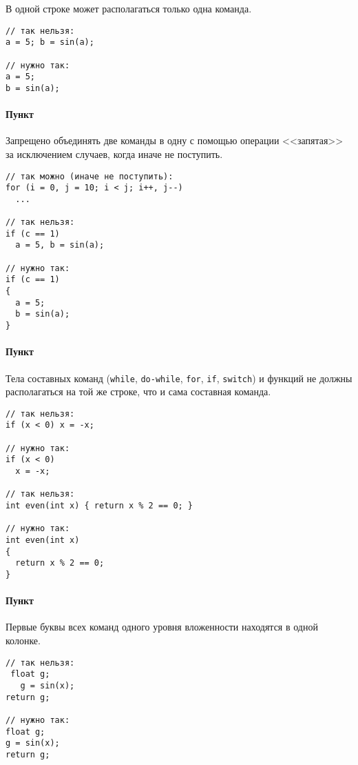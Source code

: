 В одной строке может располагаться только одна команда.

\begin{verbatim}
// так нельзя:
a = 5; b = sin(a);

// нужно так:
a = 5;
b = sin(a);
\end{verbatim}

\paragraph{Пункт}

Запрещено объединять две команды в одну с помощью операции <<запятая>>
за исключением случаев, когда иначе не поступить.

\begin{verbatim}
// так можно (иначе не поступить):
for (i = 0, j = 10; i < j; i++, j--)
  ...

// так нельзя:
if (c == 1)
  a = 5, b = sin(a);

// нужно так:
if (c == 1)
{
  a = 5;
  b = sin(a);
}
\end{verbatim}

\paragraph{Пункт}

Тела составных команд (\texttt{while}, \texttt{do-while}, \texttt{for},
\texttt{if}, \texttt{switch}) и функций не должны располагаться на той
же строке, что и сама составная команда.

\begin{verbatim}
// так нельзя:
if (x < 0) x = -x;

// нужно так:
if (x < 0)
  x = -x;

// так нельзя:
int even(int x) { return x % 2 == 0; }

// нужно так:
int even(int x)
{
  return x % 2 == 0;
}
\end{verbatim}

\paragraph{Пункт}

Первые буквы всех команд одного уровня вложенности находятся в одной
колонке.

\begin{verbatim}
// так нельзя:
 float g;
   g = sin(x);
return g;

// нужно так:
float g;
g = sin(x);
return g;
\end{verbatim}

